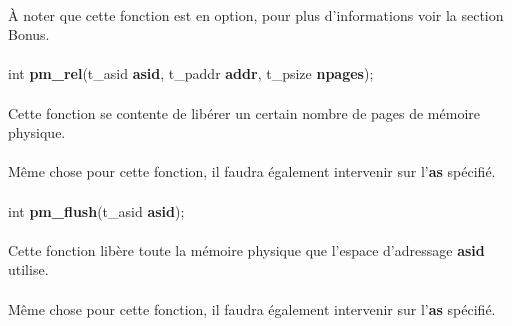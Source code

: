 \documentclass[10pt,a4wide]{article}
\begin{document}
\paragraph{}

\`A noter que cette fonction est en option, pour plus d'informations voir
la section Bonus.

\paragraph{}

\hspace{1.5cm}int \textbf{pm\_rel}(t\_asid \textbf{asid},
                                   t\_paddr \textbf{addr},
                                   t\_psize \textbf{npages});

\paragraph{}

Cette fonction se contente de lib\'erer un certain nombre
de pages de m\'emoire physique.

\paragraph{}

M\^eme chose pour cette fonction, il faudra \'egalement intervenir sur
l'\textbf{as} sp\'ecifi\'e.

\paragraph{}

\hspace{1.5cm}int \textbf{pm\_flush}(t\_asid \textbf{asid});

\paragraph{}

Cette fonction lib\`ere toute la m\'emoire physique que l'espace d'adressage
\textbf{asid} utilise.

\paragraph{}

M\^eme chose pour cette fonction, il faudra \'egalement intervenir sur
l'\textbf{as} sp\'ecifi\'e.

\paragraph{}
\end{document}
